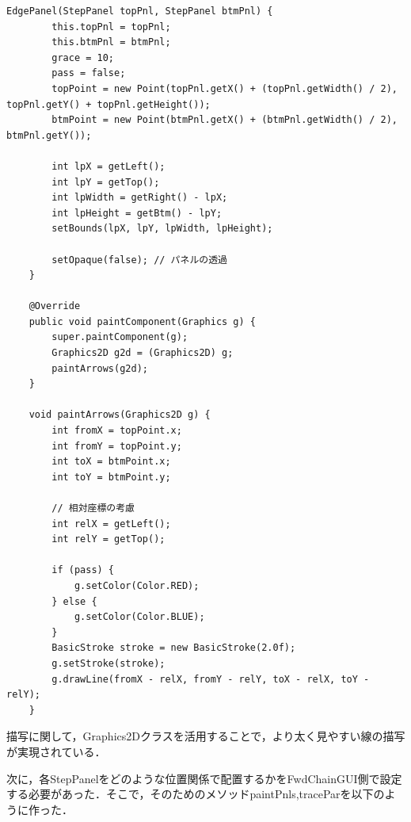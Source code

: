 \documentclass[12pt]{jarticle}
\begin{document}
\begin{lstlisting}[caption=StepPanelクラスのコンストラクタとpaintComponent，paintArrowsメソッド, label=edge]
    EdgePanel(StepPanel topPnl, StepPanel btmPnl) {
        this.topPnl = topPnl;
        this.btmPnl = btmPnl;
        grace = 10;
        pass = false;
        topPoint = new Point(topPnl.getX() + (topPnl.getWidth() / 2), topPnl.getY() + topPnl.getHeight());
        btmPoint = new Point(btmPnl.getX() + (btmPnl.getWidth() / 2), btmPnl.getY());

        int lpX = getLeft();
        int lpY = getTop();
        int lpWidth = getRight() - lpX;
        int lpHeight = getBtm() - lpY;
        setBounds(lpX, lpY, lpWidth, lpHeight);

        setOpaque(false); // パネルの透過
    }

    @Override
    public void paintComponent(Graphics g) {
        super.paintComponent(g);
        Graphics2D g2d = (Graphics2D) g;
        paintArrows(g2d);
    }

    void paintArrows(Graphics2D g) {
        int fromX = topPoint.x;
        int fromY = topPoint.y;
        int toX = btmPoint.x;
        int toY = btmPoint.y;

        // 相対座標の考慮
        int relX = getLeft();
        int relY = getTop();

        if (pass) {
            g.setColor(Color.RED);
        } else {
            g.setColor(Color.BLUE);
        }
        BasicStroke stroke = new BasicStroke(2.0f);
        g.setStroke(stroke);
        g.drawLine(fromX - relX, fromY - relY, toX - relX, toY - relY);
    }
\end{lstlisting}

描写に関して，Graphics2Dクラスを活用することで，より太く見やすい線の描写が実現されている．

次に，各StepPanelをどのような位置関係で配置するかをFwdChainGUI側で設定する必要があった．そこで，そのためのメソッドpaintPnls,traceParを以下のように作った．
\end{document}
